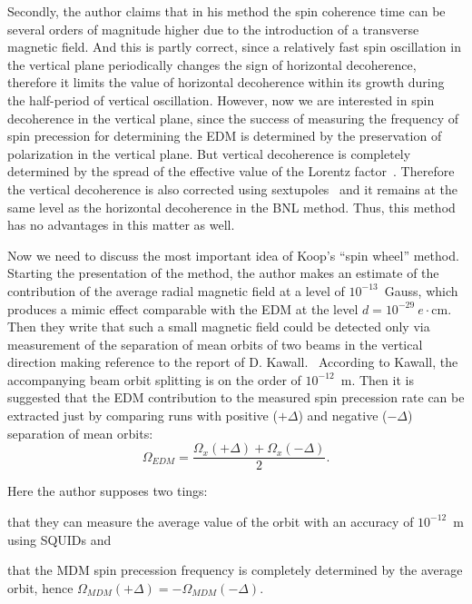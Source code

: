 \documentclass[a4paper]{jpconf}
\newcommand{\W}{\Omega}
\begin{document}
Secondly, the author claims that in his method the spin coherence time can be several orders of magnitude higher due to the introduction of a transverse magnetic field. And this is partly correct, since a relatively fast spin oscillation in the vertical plane periodically changes the sign of horizontal decoherence, therefore it limits the value of horizontal decoherence within its growth during the half-period of vertical oscillation. However, now we are interested in spin decoherence in the vertical plane, since the success of measuring the frequency of spin precession for determining the EDM is determined by the preservation of polarization in the vertical plane. But vertical decoherence is completely determined by the spread of the effective value of the Lorentz factor~\cite{Senichev:FDM}. Therefore the vertical decoherence is also corrected using sextupoles~\cite[p.~40]{Aksentev:Thesis} and it remains at the same level as the horizontal decoherence in the BNL method. Thus, this method has no advantages in this matter as well.

Now we need to discuss the most important idea of Koop’s ``spin wheel'' method. Starting the presentation of the method, the author makes an estimate of the contribution of the average radial magnetic field at a level of $10^{-13}$~Gauss, which produces a mimic effect comparable with the EDM at the level $d=10^{-29}~e\cdot$cm. Then they write that such a small magnetic field could be detected only via measurement of the separation of mean orbits of two beams in the vertical direction making reference to the report of D. Kawall.~\cite{Kawall} According to Kawall, the accompanying beam orbit splitting is on the order of $10^{-12}$~m. Then it is suggested that the EDM contribution to the measured spin precession rate can be extracted just by comparing runs with positive ($+\Delta$)  and negative ($-\Delta$) separation of mean orbits:
\begin{equation*}
	\W_{EDM} = \frac{\W_x(+\Delta) + \W_x(-\Delta)}{2}.
\end{equation*}

Here the author supposes two tings:
\begin{enumerate*}[(1)] 
\item that they can measure the average value of the orbit with an accuracy of $10^{-12}$~m using SQUIDs and \label{itm:Koop-assumption-1}
\item that the MDM spin precession frequency is completely determined by the average orbit, hence $\W_{MDM}(+\Delta) = -\W_{MDM}(-\Delta)$. \label{itm:Koop-assumption-2}
\end{enumerate*}
\end{document}
